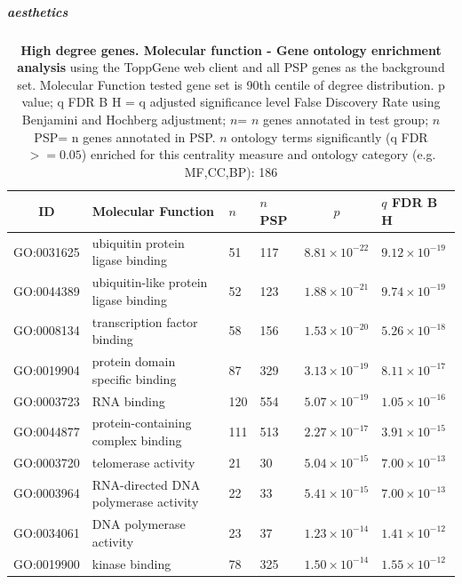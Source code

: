 
\subparagraph{aesthetics}
\begin{table}[ht]
\centering
\begin{adjustbox}{width=\textwidth}
\setlength{\extrarowheight}{2pt}

\begin{tabular}{@{}clllcl@{}}
  \toprule
ID & Molecular Function & $n$ & $n$ PSP & $p$ & $q$ FDR B H \\ 
  \midrule
GO:0031625 & ubiquitin protein ligase binding & 51 & 117 & $8.81 \times 10^{-22}$ & $9.12 \times 10^{-19}$ \\ 
  GO:0044389 & ubiquitin-like protein ligase binding & 52 & 123 & $1.88 \times 10^{-21}$ & $9.74 \times 10^{-19}$ \\ 
  GO:0008134 & transcription factor binding & 58 & 156 & $1.53 \times 10^{-20}$ & $5.26 \times 10^{-18}$ \\ 
  GO:0019904 & protein domain specific binding & 87 & 329 & $3.13 \times 10^{-19}$ & $8.11 \times 10^{-17}$ \\ 
  GO:0003723 & RNA binding & 120 & 554 & $5.07 \times 10^{-19}$ & $1.05 \times 10^{-16}$ \\ 
  GO:0044877 & protein-containing complex binding & 111 & 513 & $2.27 \times 10^{-17}$ & $3.91 \times 10^{-15}$ \\ 
  GO:0003720 & telomerase activity & 21 & 30 & $5.04 \times 10^{-15}$ & $7.00 \times 10^{-13}$ \\ 
  GO:0003964 & RNA-directed DNA polymerase activity & 22 & 33 & $5.41 \times 10^{-15}$ & $7.00 \times 10^{-13}$ \\ 
  GO:0034061 & DNA polymerase activity & 23 & 37 & $1.23 \times 10^{-14}$ & $1.41 \times 10^{-12}$ \\ 
  GO:0019900 & kinase binding & 78 & 325 & $1.50 \times 10^{-14}$ & $1.55 \times 10^{-12}$ \\ 
   \bottomrule
\end{tabular}
\end{adjustbox}
\caption[Gene ontology Molecular Function enrichment of genes above 90th centile of degree distribution]{\textbf{High degree genes. Molecular function - Gene ontology enrichment analysis} using the ToppGene web client and all PSP genes as the background set.  Molecular Function tested gene set is 90th centile of degree distribution.  p value; q FDR B H = q adjusted significance level False Discovery Rate using Benjamini and Hochberg adjustment; $n$= $n$ genes annotated in test group; $n$ PSP= n genes annotated in PSP. $n$ ontology terms significantly (q FDR$>=0.05$) enriched for this centrality measure and ontology category (e.g. MF,CC,BP): 186} 
\label{tab:ToppGENE GO: Molecular Function. 90 centile cwpsp.txtp = p value; q FDR B H = q adjusted significance level False Discovery Rate using Benjamini and Hochberg adjustment; n= n genes annotated in test group; n PSP= n genes annotated in PSP. n significant in category 186}
\end{table}
